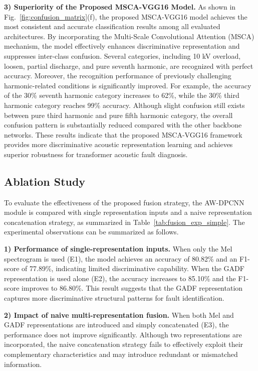 \documentclass[anonymous]{iopjournal}
\begin{document}
\textbf{3) Superiority of the Proposed MSCA-VGG16 Model.}
As shown in Fig.~\ref{fig:confusion_matrix}(f), the proposed MSCA-VGG16 model achieves the most consistent and accurate classification results among all evaluated architectures. By incorporating the Multi-Scale Convolutional Attention (MSCA) mechanism, the model effectively enhances discriminative representation and suppresses inter-class confusion. Several categories, including 10 kV overload, loosen, partial discharge, and pure seventh harmonic, are recognized with perfect accuracy. Moreover, the recognition performance of previously challenging harmonic-related conditions is significantly improved. For example, the accuracy of the 30\% seventh harmonic category increases to 62\%, while the 30\% third harmonic category reaches 99\% accuracy. Although slight confusion still exists between pure third harmonic and pure fifth harmonic category, the overall confusion pattern is substantially reduced compared with the other backbone networks. These results indicate that the proposed MSCA-VGG16 framework provides more discriminative acoustic representation learning and achieves superior robustness for transformer acoustic fault diagnosis.

\subsection{Ablation Study} 	
To evaluate the effectiveness of the proposed fusion strategy, the AW-DPCNN module is compared with single representation inputs and a naive representation concatenation strategy, as summarized in Table~\ref{tab:fusion_exp_simple}. The experimental observations can be summarized as follows.

\textbf{1) Performance of single-representation inputs.}
When only the Mel spectrogram is used (E1), the model achieves an accuracy of 80.82\% and an F1-score of 77.89\%, indicating limited discriminative capability. When the GADF representation is used alone (E2), the accuracy increases to 85.10\% and the F1-score improves to 86.80\%. This result suggests that the GADF representation captures more discriminative structural patterns for fault identification.

\textbf{2) Impact of naive multi-representation fusion.}
When both Mel and GADF representations are introduced and simply concatenated (E3), the performance does not improve significantly. Although two representations are incorporated, the naive concatenation strategy fails to effectively exploit their complementary characteristics and may introduce redundant or mismatched information.
\end{document}
